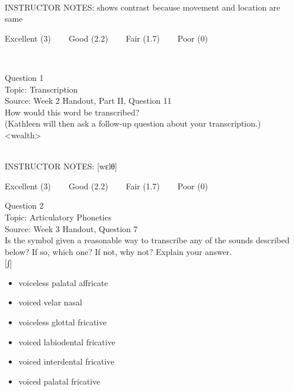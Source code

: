 \documentclass[12pt]{article}
\begin{document}
~\\
INSTRUCTOR NOTES: shows contrast because movement and location are same


\vfill
Excellent (3) ~~~ Good (2.2) ~~~ Fair (1.7) ~~~ Poor (0)
\newpage

\begin{center}
\textbf{{\color{red}{\HUGE END OF EXAM}}}\\

\end{center}
\newpage

\begin{center}
\textbf{{\color{blue}{\HUGE START OF EXAM\\}}}

\textbf{{\color{blue}{\HUGE Student ID: 78265\\}}}

\textbf{{\color{blue}{\HUGE \\}}}

\end{center}
\newpage

{\large Question 1}\\

Topic: Transcription\\
Source: Week 2 Handout, Part II, Question 11\\

How would this word be transcribed?\\ (Kathleen will then ask a follow-up question about your transcription.)\\

<wealth>


~\\
INSTRUCTOR NOTES: [wɛlθ]


\vfill
Excellent (3) ~~~ Good (2.2) ~~~ Fair (1.7) ~~~ Poor (0)
\newpage

{\large Question 2}\\

Topic: Articulatory Phonetics\\
Source: Week 3 Handout, Question 7\\

Is the symbol given a reasonable way to transcribe any of the sounds described below? If so, which one? If not, why not? Explain your answer.\\

{[ʃ]}

\begin{itemize} \item voiceless palatal affricate \item voiced velar nasal \item voiceless glottal fricative \item voiced labiodental fricative \item voiced interdental fricative \item voiced palatal fricative \end{itemize}
\end{document}
